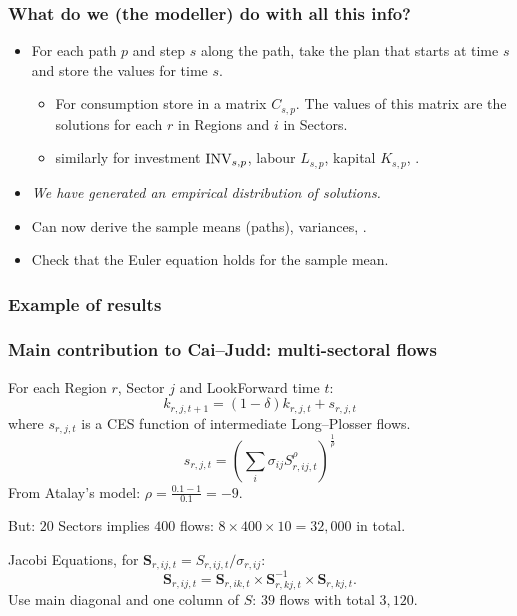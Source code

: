 \documentclass[handout,english]{beamer}
\begin{document}
\begin{frame}
  \frametitle{What do we (the modeller) do with all this info?}
  \begin{itemize}
    
    \item For each path $p$ and step $s$ along the path, take the plan that
      starts at time $s$ and store the values for time $s$.
    \begin{itemize}
      \item For consumption store in a matrix $C_{s, p}$. The values of this
        matrix are the solutions for each $r$ in Regions and $i$ in Sectors.

      \item similarly for investment $\textup{INV}_{s, p}$, labour $L_{s, p}$,
        kapital $K_{s, p}$, \etc.
    \end{itemize}
    \item \emph{We have generated an empirical distribution of solutions.}

    \item Can now derive the sample means (paths), variances, \etc.

    \item Check that the Euler equation holds for the sample mean.

  \end{itemize}
\end{frame}
\begin{frame}
  \frametitle{Example of results}
  
  
\end{frame}
\begin{frame}\thispagestyle{empty}
  \frametitle{Main contribution to Cai--Judd: multi-sectoral flows}
  For each Region $r$, Sector $j$ and LookForward time $t$:
  \[
    k_{r, j, t + 1} = (1 - \delta) k_{r, j, t} + s_{r, j, t}
  \]
  where $s_{r, j, t}$ is a CES function of intermediate Long--Plosser flows.
  \[
    s_{r, j, t} = \left(\sum_{i} \sigma_{i j} S_{r, i j, t} ^ {\rho} \right)
      ^ {\frac{1}{\rho}}
  \]
  From Atalay's model: $\rho = \frac{0.1 - 1}{0.1} = -9$.

  But: $20$ Sectors implies $400$ flows: $8 \times 400 \times 10 = 32,000$ in 
  total.

  Jacobi Equations, for $\mathbf{S}_{r, ij, t} = S_{r, ij, t} / \sigma_{r, ij}$:
    \[
      \mathbf{S}_{r, ij, t} = \mathbf{S}_{r, ik, t} \times
      \mathbf{S}_{r, kj, t}^{-1} \times \mathbf{S}_{r, kj, t} .
    \]
  Use main diagonal and one column of $S$: $39$ flows with total $3,120$.
\end{frame}
\end{document}
